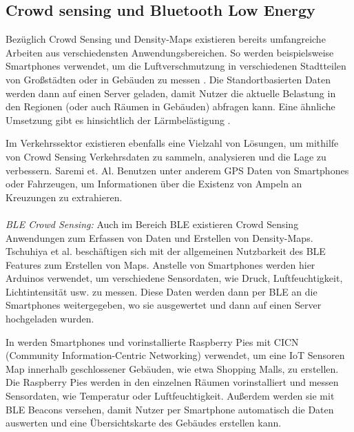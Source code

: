 \documentclass[conference]{IEEEtran}
\begin{document}
\subsection{Crowd sensing und Bluetooth Low Energy}

Bezüglich Crowd Sensing und Density-Maps existieren  bereits umfangreiche Arbeiten aus verschiedensten Anwendungsbereichen. 
So werden beispielsweise Smartphones verwendet, um die Luftverschmutzung in verschiedenen Stadtteilen von Großstädten oder in Gebäuden zu messen \cite{AirQuality}. 
Die Standortbasierten Daten werden dann auf einen Server geladen, damit Nutzer die aktuelle Belastung in den Regionen (oder auch Räumen in Gebäuden) abfragen kann. Eine ähnliche Umsetzung gibt es hinsichtlich der Lärmbelästigung \cite{NoiseSense}. 

Im Verkehrssektor existieren ebenfalls eine Vielzahl von Lösungen, um mithilfe von Crowd Sensing Verkehrsdaten zu sammeln, analysieren und die Lage zu verbessern. 
Saremi et. Al. \cite{TrafficRegulators} Benutzen unter anderem GPS Daten von Smartphones oder Fahrzeugen, um Informationen über die Existenz von Ampeln an Kreuzungen zu extrahieren. \\
\\
\textit{BLE Crowd Sensing:}
Auch im Bereich BLE existieren Crowd Sensing Anwendungen zum Erfassen von Daten und Erstellen von Density-Maps. 
Tschuhiya et al. \cite{BLESensorDevices} beschäftigen sich mit der allgemeinen Nutzbarkeit des BLE Features zum Erstellen von Maps. 
Anstelle von Smartphones werden hier Arduinos verwendet, um verschiedene Sensordaten, wie Druck, Luftfeuchtigkeit, Lichtintensität usw. zu messen. 
Diese Daten werden dann per BLE an die Smartphones weitergegeben, wo sie ausgewertet und dann auf einen Server hochgeladen wurden. 

In \cite{CICN} werden Smartphones und vorinstallierte Raspberry Pies mit CICN (Community Information-Centric Networking)  verwendet, um eine IoT Sensoren Map innerhalb geschlossener Gebäuden, wie etwa Shopping Malls, zu erstellen. 
Die Raspberry Pies werden in den einzelnen Räumen vorinstalliert und messen Sensordaten, wie Temperatur oder Luftfeuchtigkeit. 
Außerdem werden sie mit BLE Beacons versehen, damit Nutzer per Smartphone automatisch die Daten auswerten und eine Übersichtskarte des Gebäudes erstellen kann.  
\end{document}

